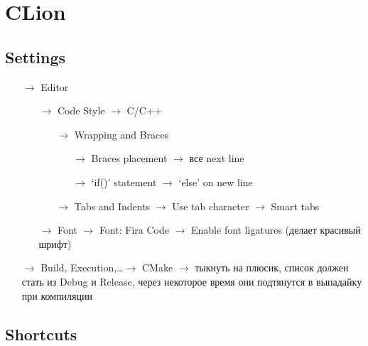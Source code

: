 \documentclass[12pt,a4paper,russian]{article}
\begin{document}

\tableofcontents

\section{CLion}

\subsection{Settings}

\begin{itemize}
	\item[$\rightarrow$] Editor
	      \begin{itemize}
		      \item[$\rightarrow$] Code Style $\rightarrow$ C/C++
		            \begin{itemize}
			            \item[$\rightarrow$] Wrapping and Braces
			                  \begin{itemize}
				                  \item[$\rightarrow$] Braces placement $\rightarrow$ все next line
				                  \item[$\rightarrow$] `if()' statement $\rightarrow$ `else' on new line
			                  \end{itemize}
			            \item[$\rightarrow$] Tabs and Indents $\rightarrow$ Use tab character $\rightarrow$ Smart tabs
		            \end{itemize}

		      \item[$\rightarrow$] Font $\rightarrow$ Font: Fira Code $\rightarrow$ Enable font ligatures (делает красивый шрифт)
	      \end{itemize}

	\item[$\rightarrow$] Build, Execution,\ldots $\rightarrow$ CMake $\rightarrow$ тыкнуть на плюсик, список должен стать из Debug и Release, через некоторое время они подтянутся в выпадайку при компиляции
\end{itemize}

\subsection{Shortcuts}
\end{document}
